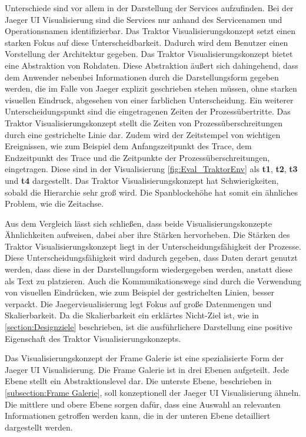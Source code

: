 Unterschiede sind vor allem in der Darstellung der Services aufzufinden. Bei der Jaeger UI Visualisierung sind die Services nur anhand des Servicenamen und Operationsnamen identifizierbar. Das Traktor Visualisierungskonzept setzt einen starken Fokus auf diese Unterscheidbarkeit. Dadurch wird dem Benutzer einen Vorstellung der Architektur gegeben. Das Traktor Visualisierungskonzept bietet eine Abstraktion von Rohdaten. Diese Abstraktion äußert sich dahingehend, dass dem Anwender nebenbei Informationen durch die Darstellungsform gegeben werden, die im Falle von Jaeger explizit geschrieben stehen müssen, ohne starken visuellen Eindruck, abgesehen von einer farblichen Unterscheidung. Ein weiterer Unterscheidungspunkt sind die eingetragenen Zeiten der Prozessübertritte. Das Traktor Visualisierungskonzept stellt die Zeiten von Prozessüberschreitungen durch eine gestrichelte Linie dar. Zudem wird der Zeitstempel von wichtigen Ereignissen, wie zum Beispiel dem Anfangszeitpunkt des Trace, dem Endzeitpunkt des Trace und die Zeitpunkte der Prozessüberschreitungen, eingetragen. Diese sind in der Visualisierung \cref{fig:Eval_TraktorEnv} als \textbf{t1}, \textbf{t2}, \textbf{t3} und \textbf{t4} dargestellt. Das Traktor Visualisierungskonzept hat Schwierigkeiten, sobald die Hierarchie sehr groß wird. Die Spanblockehöhe hat somit ein ähnliches Problem, wie die Zeitachse.

Aus dem Vergleich lässt sich schließen, dass beide Visualisierungskonzepte Ähnlichkeiten aufweisen, dabei aber ihre Stärken hervorheben. Die Stärken des Traktor Visualisierungskonzept liegt in der Unterscheidungsfähigkeit der Prozesse. Diese Unterscheidungsfähigkeit wird dadurch gegeben, dass Daten derart genutzt werden, dass diese in der Darstellungsform wiedergegeben werden, anstatt diese als Text zu platzieren. Auch die Kommunikationswege sind durch die Verwendung von visuellen Eindrücken, wie zum Beispiel der gestrichelten Linien, besser verpackt. Die Jaegervisualisierung legt Fokus auf große Datenmengen und Skalierbarkeit. Da die Skalierbarkeit ein erklärtes Nicht-Ziel ist, wie in \cref{section:Designziele} beschrieben, ist die ausführlichere Darstellung eine positive Eigenschaft des Traktor Visualisierungskonzepts.


Das Visualisierungskonzept der Frame Galerie ist eine spezialisierte Form der Jaeger UI Visualisierung. Die Frame Galerie ist in drei Ebenen aufgeteilt. Jede Ebene stellt ein Abstraktionslevel dar. Die unterste Ebene, beschrieben in \cref{subsection:Frame Galerie}, soll konzeptionell der Jaeger UI Visualisierung ähneln. Die mittlere und obere Ebene sorgen dafür, dass eine Auswahl an relevanten Informationen getroffen werden kann, die in der unteren Ebene detailliert dargestellt werden.

